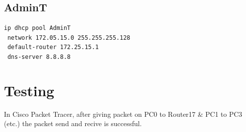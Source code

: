 \documentclass[12pt]{article}
\begin{document}
\subsection{AdminT}
\begin{lstlisting}[basicstyle=\ttfamily\small, frame=single]
ip dhcp pool AdminT
 network 172.05.15.0 255.255.255.128
 default-router 172.25.15.1
 dns-server 8.8.8.8
\end{lstlisting}
\newpage
\section{Testing}
In Cisco Packet Tracer, after giving packet on PC0 to Router17 \& PC1 to PC3 (etc.) the packet send and recive is successful. 
\end{document}
